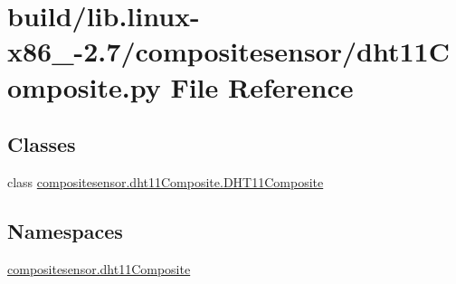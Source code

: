 \hypertarget{build_2lib_8linux-x86__64-2_87_2compositesensor_2dht11Composite_8py}{}\section{build/lib.linux-\/x86\+\_-\/2.7/compositesensor/dht11\+Composite.py File Reference}
\label{build_2lib_8linux-x86__64-2_87_2compositesensor_2dht11Composite_8py}
\subsection*{Classes}
\begin{DoxyCompactItemize}
\item 
class \hyperlink{classcompositesensor_1_1dht11Composite_1_1DHT11Composite}{compositesensor.\+dht11\+Composite.\+D\+H\+T11\+Composite}
\end{DoxyCompactItemize}
\subsection*{Namespaces}
\begin{DoxyCompactItemize}
\item 
 \hyperlink{namespacecompositesensor_1_1dht11Composite}{compositesensor.\+dht11\+Composite}
\end{DoxyCompactItemize}
